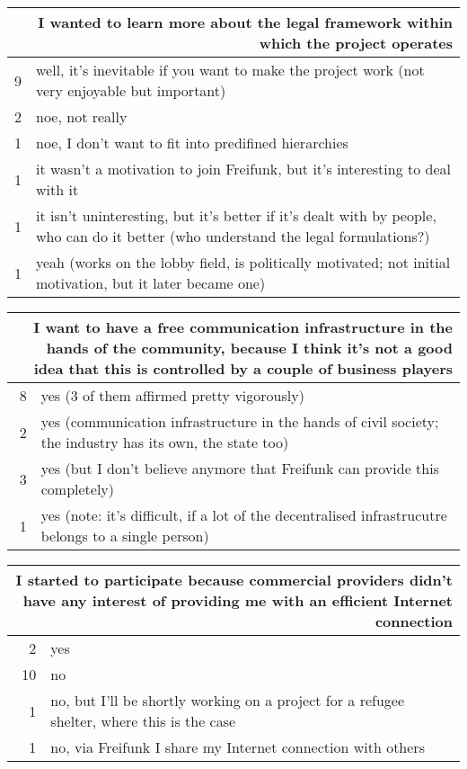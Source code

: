 \begin{table}[h]
  \begin{tabular}{| r | p{\textwidth} |}
    \hline
    \multicolumn{2}{|p{\textwidth}|}{I wanted to learn more about the legal framework within which the project operates} \\
    \hline
    9 & well, it's inevitable if you want to make the project work (not very enjoyable but important) \\
    2 & noe, not really \\
    1 & noe, I don't want to fit into predifined hierarchies \\
    1 & it wasn't a motivation to join Freifunk, but it's interesting to deal with it \\
    1 & it isn't uninteresting, but it's better if it's dealt with by people, who can do it better (who understand the legal formulations?) \\
    1 & yeah (works on the lobby field, is politically motivated; not initial motivation, but it later became one) \\
    \hline
  \end{tabular}
\end{table}

\begin{table}[h]
  \begin{tabular}{| r | p{\textwidth} |}
    \hline
    \multicolumn{2}{|p{\textwidth}|}{I want to have a free communication infrastructure in the hands of the community, because I think it's not a good idea that this is controlled by a couple of business players} \\
    \hline
    8 & yes (3 of them affirmed pretty vigorously) \\
    2 & yes (communication infrastructure in the hands of civil society; the industry has its own, the state too) \\
    3 & yes (but I don't believe anymore that Freifunk can provide this completely) \\
    1 & yes (note: it's difficult, if a lot of the decentralised infrastrucutre belongs to a single person) \\
    \hline
  \end{tabular}
\end{table}

\begin{table}[h]
  \begin{tabular}{| r | p{\textwidth} |}
    \hline
    \multicolumn{2}{|p{\textwidth}|}{I started to participate because commercial providers didn't have any interest of providing me with an efficient Internet connection} \\
    \hline
    2  & yes \\
    10 & no \\
    1  & no, but I'll be shortly working on a project for a refugee shelter, where this is the case \\
    1  & no, via Freifunk I share my Internet connection with others \\
    \hline
  \end{tabular}
\end{table}

